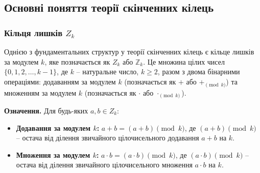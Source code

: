\documentclass[a4paper,12pt]{article}
\begin{document}
    \subsection{Основні поняття теорії скінченних кілець} %

    \subsubsection{Кільця лишків \(Z_k\)} %
    Однією з фундаментальних структур у теорії скінченних кілець є кільце лишків за модулем \(k\), яке позначається як \(Z_k\) або \(\mathbb{Z}_k\). Це множина цілих чисел \(\{0, 1, 2, \ldots, k-1\}\), де \(k\) -- натуральне число, \(k \ge 2\), разом з двома бінарними операціями: додаванням за модулем \(k\) (позначається як \(+\) або \(+_{\pmod{k}}\)) та множенням за модулем \(k\) (позначається як \(\cdot\) або \(\cdot_{\pmod{k}}\)).

    \textbf{Означення.} Для будь-яких \(a, b \in Z_k\):
    \begin{itemize}
        \item \textbf{Додавання за модулем \(k\):} \(a + b = (a + b) \pmod{k}\), де \( (a + b) \pmod{k} \) -- остача від ділення звичайного цілочисельного додавання \(a+b\) на \(k\).
        \item \textbf{Множення за модулем \(k\):} \(a \cdot b = (a \cdot b) \pmod{k}\), де \( (a \cdot b) \pmod{k} \) -- остача від ділення звичайного цілочисельного множення \(a \cdot b\) на \(k\).
    \end{itemize}
\end{document}

